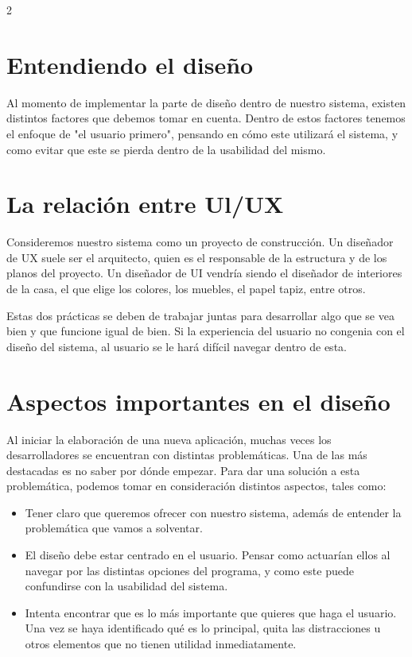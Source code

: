 \documentclass[12pt,spanish,Letterpaper,openany]{book}
\begin{document}
\begin {multicols}{2}
\hypertarget{entendiendo-el-diseuxf1o}{%
\section{Entendiendo el diseño}\label{entendiendo-el-diseuxf1o}}

Al momento de implementar la parte de diseño dentro de nuestro sistema, existen distintos factores que debemos tomar en cuenta. Dentro de estos factores tenemos el enfoque de "el usuario primero", pensando en cómo este utilizará el sistema, y como evitar que este se pierda dentro de la usabilidad del mismo.

\hypertarget{la-relaciuxf3n-entre-ulux}{%
\section{La relación entre Ul/UX}\label{la-relaciuxf3n-entre-ulux}}

Consideremos nuestro sistema como un proyecto de construcción. Un diseñador de UX suele ser el arquitecto, quien es el responsable de la estructura y de los planos del proyecto. Un diseñador de UI vendría siendo el diseñador de interiores de la casa, el que elige los colores, los muebles, el papel tapiz, entre otros.

Estas dos prácticas se deben de trabajar juntas para desarrollar algo que se vea bien y que funcione igual de bien. Si la experiencia del usuario no congenia con el diseño del sistema, al usuario se le hará difícil navegar dentro de esta.

\hypertarget{aspectos-importantes-en-el-diseuxf1o}{%
\section{Aspectos importantes en el diseño}\label{aspectos-importantes-en-el-diseuxf1o}}

Al iniciar la elaboración de una nueva aplicación, muchas veces los desarrolladores se encuentran con distintas problemáticas. Una de las más destacadas es no saber por dónde empezar. Para dar una solución a esta problemática, podemos tomar en consideración distintos aspectos, tales como:

\begin{itemize}
\item
  Tener claro que queremos ofrecer con nuestro sistema, además de entender la problemática que vamos a solventar.
\item
  El diseño debe estar centrado en el usuario. Pensar como actuarían ellos al navegar por las distintas opciones del programa, y como este puede confundirse con la usabilidad del sistema.
\item
  Intenta encontrar que es lo más importante que quieres que haga el usuario. Una vez se haya identificado qué es lo principal, quita las distracciones u otros elementos que no tienen utilidad inmediatamente.
\end{itemize}


\end{multicols}
\end{document}
